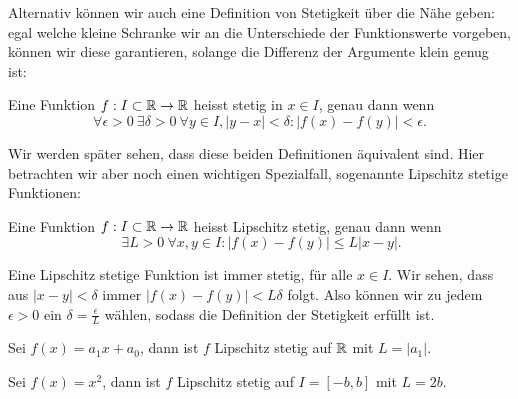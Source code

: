 Alternativ können wir auch eine Definition von Stetigkeit über die Nähe geben: egal welche kleine Schranke wir an die Unterschiede der Funktionswerte vorgeben, können wir diese garantieren, solange die Differenz der Argumente klein genug ist:
\label{vorkurs/stetigkeit:definition-1}
\begin{definition}{}{}



Eine Funktion \(f: I \subset \mathbb{R} \rightarrow \mathbb{R}\) heisst stetig in \(x \in I\), genau dann wenn
\begin{equation*}
 \forall \epsilon > 0~\exists \delta > 0 ~\forall y \in I, |y-x| < \delta: |f(x) - f(y)|<\epsilon.\end{equation*}\end{definition}

Wir werden später sehen, dass diese beiden Definitionen äquivalent sind. Hier betrachten wir aber noch einen wichtigen Spezialfall, sogenannte Lipschitz stetige Funktionen:
\label{vorkurs/stetigkeit:definition-2}
\begin{definition}{}{}



Eine Funktion \(f: I \subset \mathbb{R} \rightarrow \mathbb{R}\) heisst Lipschitz stetig, genau dann wenn
\begin{equation*}
 \ \exists L > 0 ~\forall x,y \in I: |f(x) - f(y)| \leq L |x-y|.
\end{equation*}\end{definition}

Eine Lipschitz stetige Funktion ist immer stetig, für alle \(x \in I\). Wir sehen, dass aus \(|x-y| < \delta\) immer \(|f(x) - f(y)| < L \delta\) folgt. Also können wir zu jedem \(\epsilon > 0\) ein \(\delta = \frac{\epsilon}{L}\) wählen, sodass die Definition der Stetigkeit erfüllt ist.
\label{vorkurs/stetigkeit:example-3}
\begin{example}{}{}



Sei \(f(x) = a_1 x + a_0\), dann ist \(f\) Lipschitz stetig auf \(\mathbb{R}\) mit \(L=\vert a_1 \vert\).
\end{example}
\label{vorkurs/stetigkeit:example-4}
\begin{example}{}{}



Sei \(f(x) = x^2\), dann ist \(f\) Lipschitz stetig auf \(I=[-b,b]\) mit \(L= 2b\).
\end{example}


